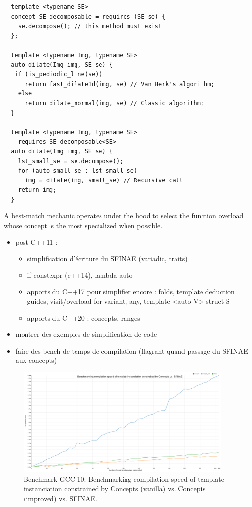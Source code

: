 \begin{verbatim}
  template <typename SE>
  concept SE_decomposable = requires (SE se) {
    se.decompose(); // this method must exist
  };

  template <typename Img, typename SE>
  auto dilate(Img img, SE se) {
   if (is_pediodic_line(se))
      return fast_dilate1d(img, se) // Van Herk's algorithm;
    else
      return dilate_normal(img, se) // Classic algorithm;
  }

  template <typename Img, typename SE>
    requires SE_decomposable<SE>
  auto dilate(Img img, SE se) {
    lst_small_se = se.decompose();
    for (auto small_se : lst_small_se)
      img = dilate(img, small_se) // Recursive call
    return img;
  }
\end{verbatim}
A best-match mechanic operates under the hood to select the function overload whose concept is the most specialized when
possible.

\begin{itemize}
  \item post C++11 :
        \begin{itemize}
          \item simplification d'écriture du SFINAE (variadic, traits)
          \item if constexpr (c++14), lambda auto
          \item apports du C++17 pour simplifier encore : folds, template deduction guides, visit/overload for variant, any, template <auto V> struct S
          \item apports du C++20 : concepts, ranges
        \end{itemize}
  \item montrer des exemples de simplification de code
  \item faire des bench de temps de compilation (flagrant quand passage du SFINAE aux concepts)
\end{itemize}

\begin{figure}[htb]
  \centering
  \includegraphics[width=4.2in]{figs/compile_time_benches/gcc10/chart.concept.png}
  \caption{Benchmark GCC-10: Benchmarking compilation speed of template instanciation constrained by Concepts (vanilla) vs. Concepts (improved) vs. SFINAE.}
  \label{fig.gen.bench.gcc10.1.concept.sfinae}
\end{figure}

